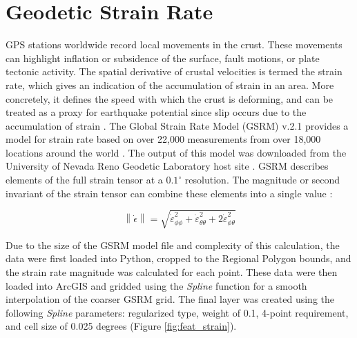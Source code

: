 \section{Geodetic Strain Rate}\label{app:dl_strain_rate}
GPS stations worldwide record local movements in the crust. These movements can highlight inflation or subsidence of the surface, fault motions, or plate tectonic activity. The spatial derivative of crustal velocities is termed the strain rate, which gives an indication of the accumulation of strain in an area. More concretely, it defines the speed with which the crust is deforming, and can be treated as a proxy for earthquake potential since slip occurs due to the accumulation of strain \citep{gem_strain_2014}. The Global Strain Rate Model (GSRM) v.2.1 provides a model for strain rate based on over 22,000 measurements from over 18,000 locations around the world \citep{kreemer_geodetic_2014}. The output of this model was downloaded from the University of Nevada Reno Geodetic Laboratory host site \citep{kreemer_global_2020}. GSRM describes elements of the full strain tensor at a $0.1^\circ$ resolution. The magnitude or second invariant of the strain tensor can combine these elements into a single value \citep{kreemer_geodetic_2014}:

\begin{equation}\label{eq:strainratemagnitude}
\left\lVert\dot{\epsilon}\right\rVert = \sqrt{\dot{\varepsilon}_{\phi\phi}^2+\dot{\varepsilon}_{\theta\theta}^2+2\dot{\varepsilon}_{\phi\theta}^2}
\end{equation}

Due to the size of the GSRM model file and complexity of this calculation, the data were first loaded into Python, cropped to the Regional Polygon bounds, and the strain rate magnitude was calculated for each point. These data were then loaded into ArcGIS and gridded using the \textit{Spline} function for a smooth interpolation of the coarser GSRM grid. The final layer  was created using the following \textit{Spline} parameters: regularized type, weight of 0.1, 4-point requirement, and cell size of 0.025 degrees (Figure \ref{fig:feat_strain}).
\vfill
\pagebreak

